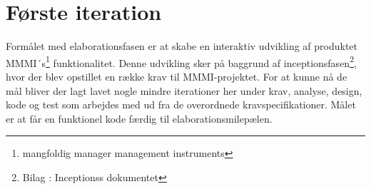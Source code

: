 \section{Første iteration}

Formålet med elaborationsfasen er at skabe en interaktiv udvikling af produktet MMMI´s\footnote{{mangfoldig manager management instruments}} funktionalitet. Denne udvikling sker på baggrund af inceptionsfasen\footnote{{Bilag : Inceptionss dokumentet}}, hvor der blev opstillet en række krav til MMMI-projektet.  For at kunne nå de mål bliver der lagt lavet nogle mindre iterationer her under krav, analyse, design, kode og test som arbejdes med ud fra de overordnede kravspecifikationer. Målet er at får en funktionel kode færdig til elaborationsmilepælen. 









